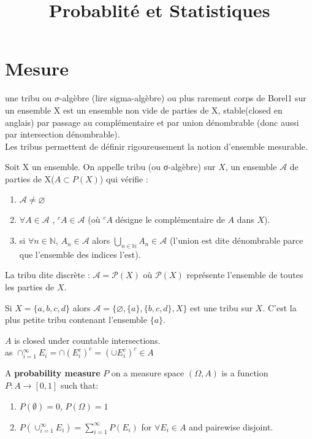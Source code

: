 \documentclass{article}
\begin{document}
\title{Probablit\'e et Statistiques}
\maketitle
\tableofcontents
\newpage
\section{Mesure}
une tribu ou $\sigma$-algèbre (lire sigma-algèbre) ou plus rarement corps de Borel1
sur un ensemble X est un ensemble non vide de parties de X,
stable(closed en anglais) par passage au complémentaire et par union dénombrable (donc aussi par intersection dénombrable).\\
Les tribus permettent de définir rigoureusement la notion d'ensemble mesurable.

\begin{definition}
Soit X un ensemble. On appelle tribu (ou σ-algèbre) sur $X$, un ensemble $\mathcal{A}$ de parties de X($A \subset P(X)$) qui vérifie :
\begin{enumerate}
\item $\mathcal{A} \not=\varnothing$
\item $\forall A \in \mathcal{A}$ ,  ${}^c A \in\mathcal{A}$  (où ${}^cA$ désigne le complémentaire de $A$ dans $X$).
\item si $\forall n \in \mathbb{N}$, $A_n \in\mathcal{A}$  alors  $\bigcup_{n\in\mathbb{N} } A_n \in\mathcal{A}$  (l'union est dite dénombrable parce que l'ensemble des indices l'est).
\end{enumerate}
\end{definition}

\begin{example}
La tribu dite discrète :  $\mathcal A = \mathcal P(X)$  où  $\mathcal P(X)$ représente l'ensemble de toutes les parties de $X$.

Si $X=\{a,b,c,d\}$ alors  $\mathcal A=\{\varnothing, \{a\}, \{b, c, d\}, X\}$ est une tribu sur $X$. C'est la plus petite tribu contenant l'ensemble  $\{a\}$.
\end{example}

$A$ is closed under countable intersections.\\
as $\cap_{i=1}^{\infty} E_i = \cap(E_i^c)^c = (\cup E_i^c)^c \in A$

\begin{definition}
A \textbf{probability measure} $P$ on a measure space $(\Omega, A)$ is a function
$P: A \rightarrow [0,1]$ such that:
\begin{enumerate}
\item $P(\emptyset) = 0$, $P(\Omega) = 1$
\item $P(\cup_{i=1}^{\infty} E_i) = \sum_{i=1}^{\infty}P(E_i)$ for $\forall E_i \in A$ and pairewise disjoint.
\end{enumerate}
\end{definition}
\end{document}
